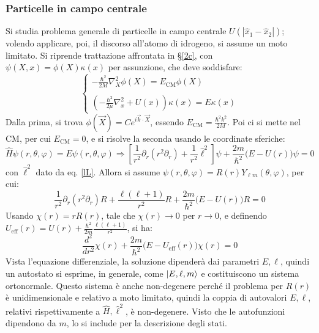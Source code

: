\documentclass[11pt, a4paper]{scrartcl} %
\numberwithin{equation}{subsection}
\theoremstyle{style2}
\theoremstyle{style1}
\begin{document}
\subsubsection{Particelle in campo centrale}
Si studia problema generale di particelle in campo centrale $U(|\hat{x}_1 - \hat{x}_2|)$; volendo applicare, poi, il discorso all'atomo di idrogeno, si assume un moto limitato. Si riprende trattazione affrontata in \S\ref{2c}, con $\psi (X,x) = \phi (X) \kappa (x)$ per assunzione, che deve soddisfare:
\begin{equation}
	\begin{cases}
		\displaystyle - \frac{\hbar ^2}{2M} \nabla^2_X \phi (X) = E_\text{CM} \phi (X)\\ 
		\\
		\displaystyle \left(- \frac{\hbar ^2}{2\mu }\nabla ^2_x + U(x)\right) \kappa (x) = E\kappa (x)
	\end{cases}
\end{equation}
Dalla prima, si trova $\phi (\vec{X}) = C e^{i\vec{k}\cdot \vec{X}} $, essendo $E_\text{CM} = \frac{\hbar ^2 k^2}{2M}$. Poi ci si mette nel CM, per cui $E_\text{CM} = 0 $, e si risolve la seconda usando le coordinate sferiche:
\begin{equation}
	\hat{H} \psi (r,\theta ,\varphi ) = E \psi (r,\theta ,\varphi ) \Rightarrow  \left[ \frac{1}{r^2} \partial _r (r^2 \partial _r) + \frac{1}{r^2}\hat{\ell }^2 \right] \psi + \frac{2m}{\hbar ^2}\Big(E - U(r)\Big) \psi  = 0
\end{equation}
con $\hat{\ell }^2$ dato da eq. \ref{lL}. Allora si assume $\psi (r,\theta ,\varphi ) = R(r) Y_{\ell m} (\theta ,\varphi )$, per cui:
\[
\frac{1}{r^2}\partial _r (r^2 \partial _r) R + \frac{\ell (\ell +1)}{r^2}R + \frac{2m}{\hbar ^2}\Big(E - U(r)\Big) R = 0
\] 
Usando $\chi (r) = r R(r)$, tale che $\chi (r) \to 0$ per $r\to 0$, e definendo $U_\text{eff}(r) = U(r) + \frac{\hbar ^2}{2m}\frac{\ell (\ell +1)}{r^2}$, si ha:
\begin{equation}
	\frac{d ^2}{d r^2} \chi (r) + \frac{2m}{\hbar ^2}\Big(E - U_\text{eff}(r)\Big) \chi (r) = 0
\end{equation}
Vista l'equazione differenziale, la soluzione dipender\`a dai parametri $E, \ell $, quindi un autostato si esprime, in generale, come $\ket{E,\ell ,m} $ e costituiscono un sistema ortonormale. Questo sistema \`e anche non-degenere perch\'e il problema per $R(r)$ \`e unidimensionale e relativo a moto limitato, quindi la coppia di autovalori $E, \ell $, relativi rispettivamente a $\hat{H}, \hat{\ell }^2$, \`e non-degenere. Visto che le autofunzioni dipendono da $m$, lo si include per la descrizione degli stati.
\end{document}
